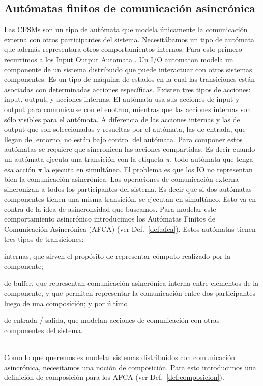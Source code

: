 \subsection{Autómatas finitos de comunicación asincrónica}
Las CFSMs son un tipo de autómata que modela únicamente la comunicación externa con otros participantes del sistema. Necesitábamos un tipo de autómata que además representara otros comportamientos internos. Para esto primero recurrimos a los Input Output Automata \cite{lynch:cwiq-2_3}. 
Un I/O automaton modela un componente de un sistema distribuido que puede interactuar con otros sistemas componentes. Es un tipo de máquina de estados en la cual las transiciones están asociadas con determinadas acciones específicas. Existen tres tipos de acciones: input, output, y acciones internas. El autómata usa sus acciones de input y output para comunicarse con el enotrno, mientras que las acciones internas son sólo visibles para el autómata. A diferencia de las acciones internas y las de output que son seleccionadas y resueltas por el autómata, las de entrada, que llegan del entorno, no están bajo control del autómata. Para componer estos autómatas se requiere que sincronicen las acciones compartidas. Es decir cuando un autómata ejecuta una transición con la etiqueta $\pi$, todo autómata que tenga esa acción $\pi$ la ejecuta en simultáneo.
El problema es que los IO no representan bien la comunicación asincrónica. Las operaciones de comunicación externa sincronizan a todos los participantes del sistema. Es decir que si dos autómatas componentes tienen una misma transición, se ejecutan en simultáneo. Esto va en contra de la idea de asincronsidad que buscamos.
Para modelar este comportamiento asincrónico introducimos los Autómatas Finitos de Comunicación Asincrónica (AFCA) (ver Def.~\ref{def:afca}). Estos autómatas tienen tres tipos de transiciones: 
\begin{inparaenum}[1)]
\item internas, que sirven el propósito de representar cómputo realizado por la componente; 
\item de buffer, que representan comunicación asincrónica interna entre elementos de la componente, y que permiten representar la comunicación entre dos participantes luego de una composición; y por último 
\item de entrada / salida, que modelan acciones de comunicación con otras componentes del sistema.
\end{inparaenum} \\
Como lo que queremos es modelar sistemas distribuidos con comunicación asincrónica, necesitamos una noción de composición. Para esto introducimos una definición de composición para los AFCA (ver Def.~\ref{def:composicion}). 

